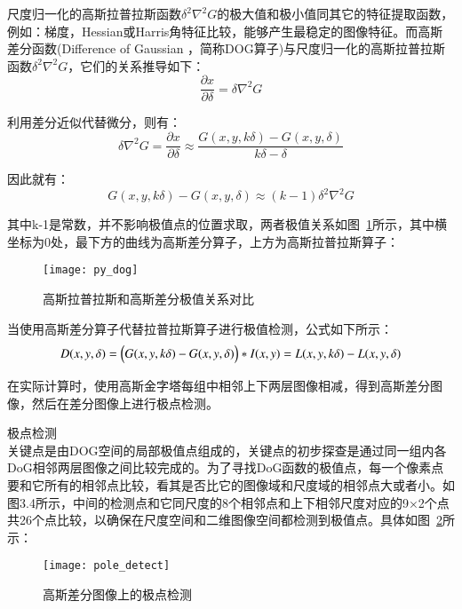 \begin{compactenum}
尺度归一化的高斯拉普拉斯函数${\delta}^2{\nabla}^2{G}$的极大值和极小值同其它的特征提取函数，例如：梯度，Hessian或Harris角特征比较，能够产生最稳定的图像特征。而高斯差分函数(Difference of Gaussian ，简称DOG算子)与尺度归一化的高斯拉普拉斯函数${\delta}^2{\nabla}^2{G}$，它们的关系推导如下：
\begin{equation}\label{dog_1}
\frac{\partial{x}}{\partial{\delta}}=\delta\nabla^2G
\end{equation}

利用差分近似代替微分，则有：
\begin{equation}\label{dog_2}
\delta\nabla^2G=\frac{\partial{x}}{\partial{\delta}}\approx\frac{G(x,y,k\delta)-G(x,y,\delta)}{k\delta-\delta}
\end{equation}

因此就有：
\begin{equation}\label{dog_3}
G(x,y,k\delta)-G(x,y,\delta)\approx(k-1)\delta^2\nabla^2G
\end{equation}

其中k-1是常数，并不影响极值点的位置求取，两者极值关系如图~\ref{fig:py_dog}所示，其中横坐标为0处，最下方的曲线为高斯差分算子，上方为高斯拉普拉斯算子：
\begin{figure}[htp]
\centering
\texttt{[image: py\_dog]}
\caption{高斯拉普拉斯和高斯差分极值关系对比}
\label{fig:py_dog}
\end{figure}

当使用高斯差分算子代替拉普拉斯算子进行极值检测，公式如下所示：
\begin{equation}\label{dog_detect}
D(x,y,\delta)=\Bigl(G(x,y,k\delta)-G(x,y,\delta)\Bigr)*I(x,y)=L(x,y,k\delta)-L(x,y,\delta)
\end{equation}

在实际计算时，使用高斯金字塔每组中相邻上下两层图像相减，得到高斯差分图像，然后在差分图像上进行极点检测。
\item 极点检测\\关键点是由DOG空间的局部极值点组成的，关键点的初步探查是通过同一组内各DoG相邻两层图像之间比较完成的。为了寻找DoG函数的极值点，每一个像素点要和它所有的相邻点比较，看其是否比它的图像域和尺度域的相邻点大或者小。如图3.4所示，中间的检测点和它同尺度的8个相邻点和上下相邻尺度对应的9×2个点共26个点比较，以确保在尺度空间和二维图像空间都检测到极值点。具体如图~\ref{fig:pole_detect}所示：
\begin{figure}[htp]
\centering
\texttt{[image: pole\_detect]}
\caption{高斯差分图像上的极点检测}
\label{fig:pole_detect}
\end{figure}


\end{compactenum}
